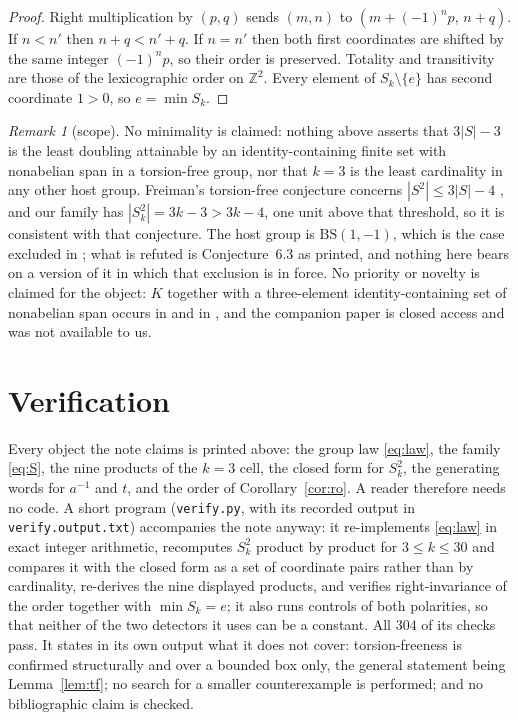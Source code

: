 \documentclass[11pt]{amsart}
\theoremstyle{remark}
\newtheorem*{remark}{Remark}
\begin{document}
\begin{proof}
Right multiplication by $(p,q)$ sends $(m,n)$ to $(m+(-1)^{n}p,\,n+q)$. If $n<n'$
then $n+q<n'+q$. If $n=n'$ then both first coordinates are shifted by the same
integer $(-1)^{n}p$, so their order is preserved. Totality and transitivity are
those of the lexicographic order on $\mathbb{Z}^{2}$. Every element of
$S_{k}\setminus\{e\}$ has second coordinate $1>0$, so $e=\min S_{k}$.
\end{proof}

\begin{remark}[scope]
No minimality is claimed: nothing above asserts that $3|S|-3$ is the least
doubling attainable by an identity-containing finite set with nonabelian span in a
torsion-free group, nor that $k=3$ is the least cardinality in any other host
group. Freiman's torsion-free conjecture concerns $|S^{2}|\le3|S|-4$
\cite[\S1]{BPS}, and our family has $|S_{k}^{2}|=3k-3>3k-4$, one unit above that
threshold, so it is consistent with that conjecture. The host group is
$\mathrm{BS}(1,-1)$, which is the case excluded in \cite[Theorem~2.11]{MN}; what
is refuted is Conjecture~6.3 as printed, and nothing here bears on a version of it
in which that exclusion is in force. No priority or novelty is claimed for the
object: $K$ together with a three-element identity-containing set of nonabelian
span occurs in \cite[\S1]{BPS} and in \cite{AJ}, and the companion paper
\cite{MNS} is closed access and was not available to us.
\end{remark}

\section{Verification}

Every object the note claims is printed above: the group law \eqref{eq:law}, the
family \eqref{eq:S}, the nine products of the $k=3$ cell, the closed form for
$S_{k}^{2}$, the generating words for $a^{-1}$ and $t$, and the order of
Corollary~\ref{cor:ro}. A reader therefore needs no code. A short program
(\texttt{verify.py}, with its recorded output in \texttt{verify.output.txt})
accompanies the note anyway: it re-implements \eqref{eq:law} in exact integer
arithmetic, recomputes $S_{k}^{2}$ product by product for $3\le k\le30$ and
compares it with the closed form as a set of coordinate pairs rather than by
cardinality, re-derives the nine displayed products, and verifies
right-invariance of the order together with $\min S_{k}=e$; it also runs controls
of both polarities, so that neither of the two detectors it uses can be a
constant. All $304$ of its checks pass. It states in its own output what it does
not cover: torsion-freeness is confirmed structurally and over a bounded box only,
the general statement being Lemma~\ref{lem:tf}; no search for a smaller
counterexample is performed; and no bibliographic claim is checked.
\end{document}
